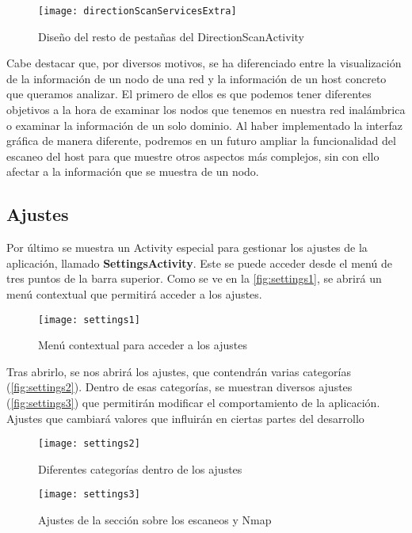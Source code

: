 \begin{figure}[H]
	\centering
	\texttt{[image: directionScanServicesExtra]}
	\caption{Diseño del resto de pestañas del DirectionScanActivity}
	\label{fig:directionScanServicesExtra}
\end{figure}

Cabe destacar que, por diversos motivos, se ha diferenciado entre la visualización de la información de un nodo de una red y la información de un host concreto que queramos analizar. El primero de ellos es que podemos tener diferentes objetivos a la hora de examinar los nodos que tenemos en nuestra red inalámbrica o examinar la información de un solo dominio. Al haber implementado la interfaz gráfica de manera diferente, podremos en un futuro ampliar la funcionalidad del escaneo del host para que muestre otros aspectos más complejos, sin con ello afectar a la información que se muestra de un nodo.

\subsection{Ajustes}

Por último se muestra un Activity especial para gestionar los ajustes de la aplicación, llamado \textbf{SettingsActivity}. Este se puede acceder desde el menú de tres puntos de la barra superior. Como se ve en la \autoref{fig:settings1}, se abrirá un menú contextual que permitirá acceder a los ajustes.

\begin{figure}[H]
	\centering
	\texttt{[image: settings1]}
	\caption{Menú contextual para acceder a los ajustes}
	\label{fig:settings1}
\end{figure}

Tras abrirlo, se nos abrirá los ajustes, que contendrán varias categorías (\autoref{fig:settings2}). Dentro de esas categorías, se muestran diversos ajustes (\autoref{fig:settings3}) que permitirán modificar el comportamiento de la aplicación. Ajustes que cambiará valores que influirán en ciertas partes del desarrollo

\begin{figure}[H]
	\centering
	\texttt{[image: settings2]}
	\caption{Diferentes categorías dentro de los ajustes}
	\label{fig:settings2}
\end{figure}

\begin{figure}[H]
	\centering
	\texttt{[image: settings3]}
	\caption{Ajustes de la sección sobre los escaneos y Nmap}
	\label{fig:settings3}
\end{figure}

